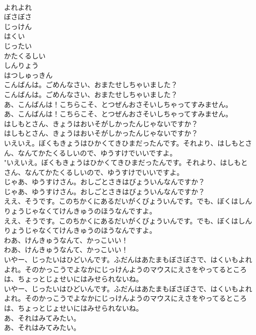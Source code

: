 \documentclass[8pt]{extreport}
\begin{document}
\begin{CJK}{UTF8}{min}
\\	よれよれ
\\	ぼさぼさ
\\	じっけん
\\	はくい
\\	じったい
\\	かたくるしい
\\	しんりょう
\\	はつしゅっきん
\\	こんばんは。ごめんなさい、おまたせしちゃいました？	
\\	こんばんは。ごめんなさい、おまたせしちゃいました？ 
\\	あ、こんばんは！こちらこそ、とつぜんおさそいしちゃってすみません。	
\\	あ、こんばんは！こちらこそ、とつぜんおさそいしちゃってすみません。 
\\	はしもとさん、きょうはおいそがしかったんじゃないですか？	
\\	はしもとさん、きょうはおいそがしかったんじゃないですか？ 
\\	いえいえ。ぼくもきょうはひかくてきひまだったんです。それより、はしもとさん、なんてかたくるしいので、ゆうすけでいいですよ。	
\\	"いえいえ。ぼくもきょうはひかくてきひまだったんです。それより、はしもとさん、なんてかたくるしいので、ゆうすけでいいですよ。 
\\	じゃあ、ゆうすけさん。おしごとさきはびょういんなんですか？	
\\	じゃあ、ゆうすけさん。おしごとさきはびょういんなんですか？ 
\\	ええ、そうです。このちかくにあるだいがくびょういんです。でも、ぼくはしんりょうじゃなくてけんきゅうのほうなんですよ。	
\\	ええ、そうです。このちかくにあるだいがくびょういんです。でも、ぼくはしんりょうじゃなくてけんきゅうのほうなんですよ。 
\\	わあ、けんきゅうなんて、かっこいい！	
\\	わあ、けんきゅうなんて、かっこいい！ 
\\	いやー、じったいはひどいんです。ふだんはあたまもぼさぼさで、はくいもよれよれ。そのかっこうでよなかにじっけんようのマウスにえさをやってるところは、ちょっとじょせいにはみせられないね。	
\\	いやー、じったいはひどいんです。ふだんはあたまもぼさぼさで、はくいもよれよれ。そのかっこうでよなかにじっけんようのマウスにえさをやってるところは、ちょっとじょせいにはみせられないね。 
\\	あ、それはみてみたい。	
\\	あ、それはみてみたい。 

\end{CJK}
\end{document}
